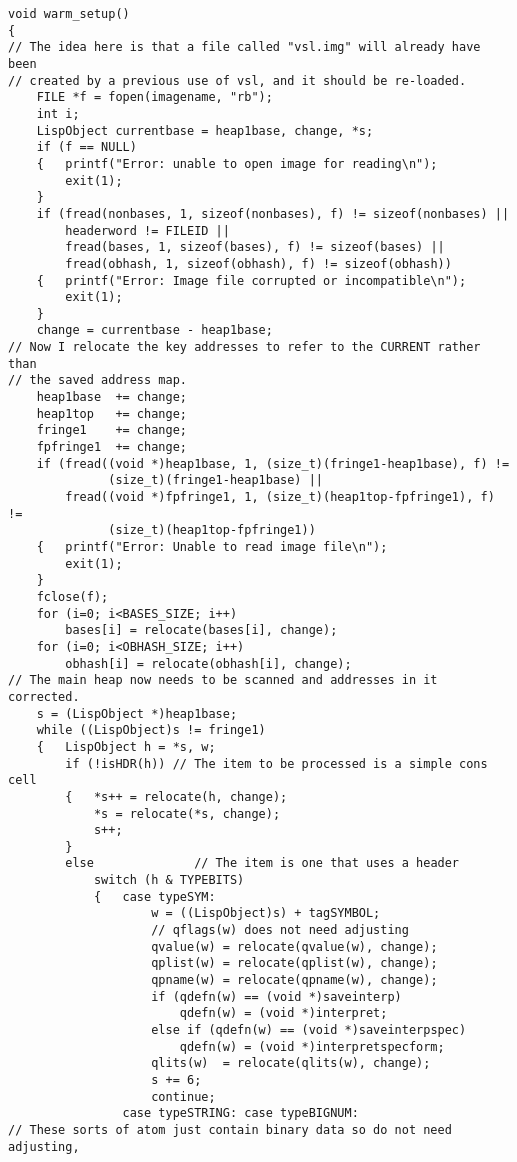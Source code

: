{\begin{verbatim}
void warm_setup()
{
// The idea here is that a file called "vsl.img" will already have been
// created by a previous use of vsl, and it should be re-loaded.
    FILE *f = fopen(imagename, "rb");
    int i;
    LispObject currentbase = heap1base, change, *s;
    if (f == NULL)
    {   printf("Error: unable to open image for reading\n");
        exit(1);
    }
    if (fread(nonbases, 1, sizeof(nonbases), f) != sizeof(nonbases) ||
        headerword != FILEID ||
        fread(bases, 1, sizeof(bases), f) != sizeof(bases) ||
        fread(obhash, 1, sizeof(obhash), f) != sizeof(obhash))
    {   printf("Error: Image file corrupted or incompatible\n");
        exit(1);
    }
    change = currentbase - heap1base;
// Now I relocate the key addresses to refer to the CURRENT rather than
// the saved address map.
    heap1base  += change;
    heap1top   += change;
    fringe1    += change;
    fpfringe1  += change;
    if (fread((void *)heap1base, 1, (size_t)(fringe1-heap1base), f) !=
              (size_t)(fringe1-heap1base) ||
        fread((void *)fpfringe1, 1, (size_t)(heap1top-fpfringe1), f) !=
              (size_t)(heap1top-fpfringe1))
    {   printf("Error: Unable to read image file\n");
        exit(1);
    }
    fclose(f);
    for (i=0; i<BASES_SIZE; i++)
        bases[i] = relocate(bases[i], change);
    for (i=0; i<OBHASH_SIZE; i++)
        obhash[i] = relocate(obhash[i], change);
// The main heap now needs to be scanned and addresses in it corrected.
    s = (LispObject *)heap1base;
    while ((LispObject)s != fringe1)
    {   LispObject h = *s, w;
        if (!isHDR(h)) // The item to be processed is a simple cons cell
        {   *s++ = relocate(h, change);
            *s = relocate(*s, change);
            s++;
        }
        else              // The item is one that uses a header
            switch (h & TYPEBITS)
            {   case typeSYM:
                    w = ((LispObject)s) + tagSYMBOL;
                    // qflags(w) does not need adjusting
                    qvalue(w) = relocate(qvalue(w), change);
                    qplist(w) = relocate(qplist(w), change);
                    qpname(w) = relocate(qpname(w), change);
                    if (qdefn(w) == (void *)saveinterp)
                        qdefn(w) = (void *)interpret;
                    else if (qdefn(w) == (void *)saveinterpspec)
                        qdefn(w) = (void *)interpretspecform;
                    qlits(w)  = relocate(qlits(w), change);
                    s += 6;
                    continue;
                case typeSTRING: case typeBIGNUM:
// These sorts of atom just contain binary data so do not need adjusting,

\end{verbatim}}

